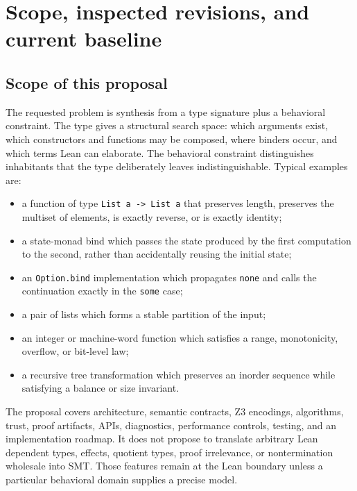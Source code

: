 \documentclass[11pt,oneside]{report}
\newcommand{\code}[1]{\texttt{#1}}
\begin{document}
\tableofcontents
\listoffigures
\listoftables
\clearpage
{}

\chapter{Scope, inspected revisions, and current baseline}
\label{chap:baseline}

\section{Scope of this proposal}

The requested problem is synthesis from a type signature plus a behavioral constraint. The type gives a structural search space: which arguments exist, which constructors and functions may be composed, where binders occur, and which terms Lean can elaborate. The behavioral constraint distinguishes inhabitants that the type deliberately leaves indistinguishable. Typical examples are:

\begin{itemize}[leftmargin=2em]
\item a function of type \code{List a -> List a} that preserves length, preserves the multiset of elements, is exactly reverse, or is exactly identity;
\item a state-monad bind which passes the state produced by the first computation to the second, rather than accidentally reusing the initial state;
\item an \code{Option.bind} implementation which propagates \code{none} and calls the continuation exactly in the \code{some} case;
\item a pair of lists which forms a stable partition of the input;
\item an integer or machine-word function which satisfies a range, monotonicity, overflow, or bit-level law;
\item a recursive tree transformation which preserves an inorder sequence while satisfying a balance or size invariant.
\end{itemize}

The proposal covers architecture, semantic contracts, Z3 encodings, algorithms, trust, proof artifacts, APIs, diagnostics, performance controls, testing, and an implementation roadmap. It does not propose to translate arbitrary Lean dependent types, effects, quotient types, proof irrelevance, or nontermination wholesale into SMT. Those features remain at the Lean boundary unless a particular behavioral domain supplies a precise model.
\end{document}
